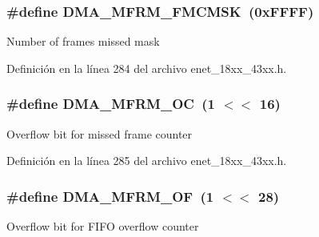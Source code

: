 \subsubsection[{\texorpdfstring{D\+M\+A\+\_\+\+M\+F\+R\+M\+\_\+\+F\+M\+C\+M\+SK}{DMA_MFRM_FMCMSK}}]{\setlength{\rightskip}{0pt plus 5cm}\#define D\+M\+A\+\_\+\+M\+F\+R\+M\+\_\+\+F\+M\+C\+M\+SK~(0x\+F\+F\+F\+F)}\hypertarget{group___e_n_e_t__18_x_x__43_x_x_ga247ccc9ffa2b0ca3a7339869bc16f53c}{}\label{group___e_n_e_t__18_x_x__43_x_x_ga247ccc9ffa2b0ca3a7339869bc16f53c}
Number of frames missed mask 

Definición en la línea 284 del archivo enet\+\_\+18xx\+\_\+43xx.\+h.

\subsubsection[{\texorpdfstring{D\+M\+A\+\_\+\+M\+F\+R\+M\+\_\+\+OC}{DMA_MFRM_OC}}]{\setlength{\rightskip}{0pt plus 5cm}\#define D\+M\+A\+\_\+\+M\+F\+R\+M\+\_\+\+OC~(1 $<$$<$ 16)}\hypertarget{group___e_n_e_t__18_x_x__43_x_x_gac24eb24508c5af680684bb064deb3230}{}\label{group___e_n_e_t__18_x_x__43_x_x_gac24eb24508c5af680684bb064deb3230}
Overflow bit for missed frame counter 

Definición en la línea 285 del archivo enet\+\_\+18xx\+\_\+43xx.\+h.

\subsubsection[{\texorpdfstring{D\+M\+A\+\_\+\+M\+F\+R\+M\+\_\+\+OF}{DMA_MFRM_OF}}]{\setlength{\rightskip}{0pt plus 5cm}\#define D\+M\+A\+\_\+\+M\+F\+R\+M\+\_\+\+OF~(1 $<$$<$ 28)}\hypertarget{group___e_n_e_t__18_x_x__43_x_x_ga9d32f00b3d211780724e25c6348c1421}{}\label{group___e_n_e_t__18_x_x__43_x_x_ga9d32f00b3d211780724e25c6348c1421}
Overflow bit for F\+I\+FO overflow counter 

